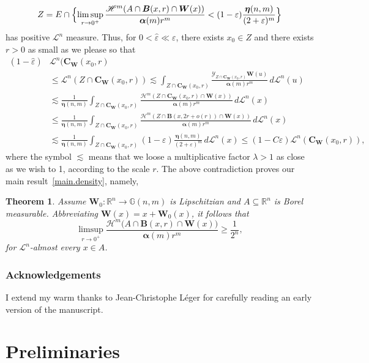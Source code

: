 \documentclass[11pt]{article}
\theoremstyle{definition}
\theoremstyle{jepanonymous}
\theoremstyle{plain}
\newtheorem*{Theorem*}{Theorem}
\newcommand{\R}{\mathbb{R}}
\newcommand{\Rn}{\R^n}
\newcommand{\calH}{\mathscr{H}}
\newcommand{\calL}{\mathscr{L}}
\newcommand{\calY}{\mathscr{Y}}
\newcommand{\balpha}{\boldsymbol{\alpha}}
\newcommand{\boldeta}{\boldsymbol{\eta}}
\newcommand{\bB}{{\boldsymbol{B}}}
\newcommand{\bC}{{\boldsymbol{C}}}
\newcommand{\bW}{{\boldsymbol{W}}}
\newcommand{\bG}{\mathbb{G}}
\let\veps\varepsilon
\let\subset\subseteq
\begin{document}
\begin{equation*}
Z = E \cap \Bigl\{ \limsup_{r \to 0^+} \frac{\calH^m (A \cap \bB(x,r) \cap \bW(x))}{\balpha(m)r^m} < (1-\veps) \frac{\boldeta(n,m)}{(2+\veps)^m} \Bigr\}
\end{equation*}
has positive $\calL^n$ measure.
Thus, for $0 < \hat{\veps} \ll \veps$, there exists $x_0 \in Z$ and there exists $r > 0$ as small as we please so that\vspace*{-3pt}
\begin{align*}
(1 - \hat{\veps})& \calL^n (\bC_\bW(x_0,r)\\[-3pt]
&\leq \calL^n \left(Z \cap \bC_\bW(x_0,r) \right) \lesssim \int_{Z \cap \bC_\bW(x_0,r)} \frac{\calY_{Z \cap \bC_\bW(x_0,r)} \bW(u)}{\balpha(m)r^m} \,d\calL^n(u) \\
&\lesssim \frac{1}{\boldeta(n,m)} \int_{Z \cap \bC_\bW(x_0,r)} \frac{\calH^m(Z \cap \bC_\bW(x_0,r) \cap \bW(x))}{\balpha(m)r^m} \,d\calL^n(x)\\
&\leq \frac{1}{\boldeta(n,m)} \int_{Z \cap \bC_\bW(x_0,r)} \frac{\calH^m(Z \cap \bB(x,2r+o(r)) \cap \bW(x))}{\balpha(m)r^m} \,d\calL^n(x) \\
&\lesssim \frac{1}{\boldeta(n,m)} \int_{Z \cap \bC_\bW(x_0,r)} (1-\veps) \frac{\boldeta(n,m)}{(2+\veps)^m} \,d\calL^n(x) \leq (1-C\veps) \calL^n(\bC_\bW(x_0,r)),
\end{align*}
where the symbol $\lesssim$ means that we loose a multiplicative factor $\lambda > 1$ as close as we wish to 1, according to the scale $r$.
The above contradiction proves our main result~\ref{main.density}, namely,
\begin{Theorem*}
Assume $\bW_0: \Rn \to \bG(n,m)$ is Lipschitzian and $A \subset \Rn$ is Borel measurable. Abbreviating $\bW(x) = x + \bW_0(x)$, it follows that
\begin{equation*}
\limsup_{r \to 0^+} \frac{\calH^m \big(A \cap \bB(x,r) \cap \bW(x) \big)}{\balpha(m)r^m} \geq \frac{1}{2^n},
\end{equation*}
for $\calL^n$-almost every $x \in A$.
\end{Theorem*}

\subsubsection*{Acknowledgements}
I extend my warm thanks to Jean-Christophe Léger for carefully reading an early version of the manuscript.

\section{Preliminaries}
\end{document}
